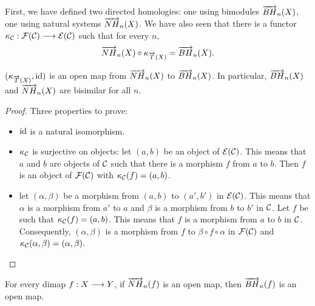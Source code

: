 First, we have defined two directed homologies: one using bimodules $\overrightarrow{BH}_{n}(X)$, one using natural systems $\overrightarrow{NH}_{n}(X)$. We have also seen that there is a functor $\kappa_{\mathcal{C}} : \mathcal{F}(\mathcal{C}) \longrightarrow \mathcal{E}(\mathcal{C})$ such that for every $n$, $$\overrightarrow{NH}_{n}(X)\circ\kappa_{\overrightarrow{T}(X)} = \overrightarrow{BH}_{n}(X).$$ 

\begin{prop}
$(\kappa_{\overrightarrow{T}(X)}, \text{id})$ is an open map from $\overrightarrow{NH}_{n}(X)$ to $\overrightarrow{BH}_{n}(X)$. In particular, $\overrightarrow{BH}_{n}(X)$ and $\overrightarrow{NH}_{n}(X)$ are bisimilar for all $n$.
\end{prop}

\begin{proof}
Three properties to prove:
\begin{itemize}
	\item $\text{id}$ is a natural isomorphism.
	\item $\kappa_{\mathcal{C}}$ is surjective on objects: let $(a,b)$ be an object of $\mathcal{E}(\mathcal{C})$. This means that $a$ and $b$ are objects of $\mathcal{C}$ such that there is a morphism $f$ from $a$ to $b$. Then $f$ is an object of $\mathcal{F}(\mathcal{C})$ with $\kappa_{\mathcal{C}}(f) = (a,b)$.
	\item let $(\alpha,\beta)$ be a morphism from $(a,b)$ to $(a',b')$ in $\mathcal{E}(\mathcal{C})$. This means that $\alpha$ is a morphism from $a'$ to $a$ and $\beta$ is a morphism from $b$ to $b'$ in $\mathcal{C}$. Let $f$ be such that $\kappa_{\mathcal{C}}(f) = (a,b)$. This means that $f$ is a morphism from $a$ to $b$ in $\mathcal{C}$. Consequently, $(\alpha,\beta)$ is a morphism from $f$ to $\beta\circ f \circ \alpha$ in $\mathcal{F}(\mathcal{C})$ and $\kappa_{\mathcal{C}}(\alpha,\beta) = (\alpha,\beta)$.
\end{itemize}
\end{proof}

\begin{prop}
\label{prop:nathomdim}
For every dimap $f : X \longrightarrow Y$, if $\overrightarrow{NH}_{n}(f)$ is an open map, then $\overrightarrow{BH}_{n}(f)$ is an open map.
\end{prop}

